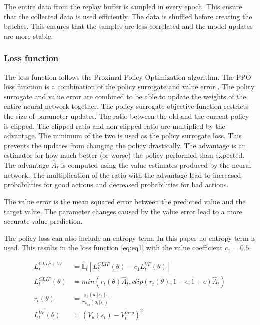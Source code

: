 The entire data from the replay buffer is sampled in every epoch. This ensure that the collected data is used efficiently. The data is shuffled before creating the batches. This ensures that the samples are less correlated and the model updates are more stable.

\subsubsection*{Loss function}

The loss function follows the Proximal Policy Optimization algorithm. The PPO loss function is a combination of the policy surrogate and value error \autocite{ppo}. The policy surrogate and value error are combined to be able to update the weights of the entire neural network together. 
The policy surrogate objective function restricts the size of parameter updates. The ratio between the old and the current policy is clipped. The clipped ratio and non-clipped ratio are multiplied by the advantage. The minimum of the two is used as the policy surrogate loss. This prevents the updates from changing the policy drastically.
The advantage is an estimator for how much better (or worse) the policy performed than expected. The advantage $\hat{A}_t$ is computed using the value estimates produced by the neural network. The multiplication of the ratio with the advantage lead to increased probabilities for good actions and decreased probabilities for bad actions.

The value error is the mean squared error between the predicted value and the target value. The parameter changes caused by the value error lead to a more accurate value prediction.

The policy loss can also include an entropy term. In this paper no entropy term is used. This results in the loss function \eqref{eq:eq1} with the value coefficient $c_1 = 0.5$.

\begin{align*}
    L_t^{CLIP + VF} &= \hat{\mathbb{E}}_t [L_t^{CLIP}(\theta) - c_1 L_t^{VF}(\theta)] \label{eq:eq1}\tag{PPO Loss} \\
    L_t^{CLIP}(\theta) &= min(r_t(\theta)\hat{A}_t, clip(r_t(\theta), 1-\epsilon, 1+\epsilon)\hat{A}_t) \label{eq:eq2}\tag{Surrogate Objective}\\
    r_t(\theta) &= \frac{\pi_\theta(a_t|s_t)}{\pi_{\theta_{old}}(a_t|s_t)} \label{eq:eq3}\tag{Ratio}\\
    L_t^{VF}(\theta) &= (V_\theta (s_t) - V_t^{targ})^2 \label{eq:eq4}\tag{Value Error}
\end{align*}

